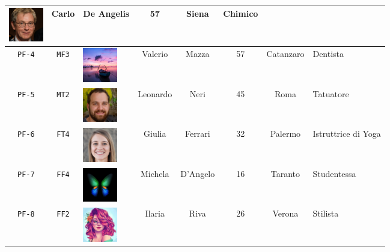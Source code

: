 \begin{table}[H]
\begin{tabular}[c]{ |c|c|m{1.5cm}|c|c|c|c|m{1.85cm}| }
	\vspace{.15cm}
	\includegraphics[height=1.5cm]{immagini/MT3.jpg}
	&Carlo&De Angelis&57&Siena&Chimico\\	 	
	\hline
	\cellcolor[HTML]{b0d7ff}\texttt{PF-4}&\cellcolor[HTML]{e6f2ff}\texttt{MF3}&	
	\vspace{.15cm}
	\includegraphics[height=1.5cm]{immagini/MF3.jpg}
	&Valerio&Mazza&57&Catanzaro&Dentista\\
	\hline 		
	\cellcolor[HTML]{b0d7ff}\texttt{PF-5}&\cellcolor[HTML]{e6f2ff}\texttt{MT2}&	
	\vspace{.15cm}
	\includegraphics[height=1.5cm]{immagini/MT2.jpg}
	&Leonardo&Neri&45&Roma&Tatuatore\\
	\hline
	\cellcolor[HTML]{b0d7ff}\texttt{PF-6}&\cellcolor[HTML]{e6f2ff}\texttt{FT4}&	
	\vspace{.15cm}
	\includegraphics[height=1.5cm]{immagini/FT4.jpg}
	&Giulia&Ferrari&32&Palermo&Istruttrice di Yoga\\ 
	\hline
	\cellcolor[HTML]{b0d7ff}\texttt{PF-7}&\cellcolor[HTML]{e6f2ff}\texttt{FF4}&	
	\vspace{.15cm}
	\includegraphics[height=1.5cm]{immagini/FF4.png}
	&Michela&D'Angelo&16&Taranto&Studentessa\\
	\hline
	\cellcolor[HTML]{b0d7ff}\texttt{PF-8}&\cellcolor[HTML]{e6f2ff}\texttt{FF2}&	
	\vspace{.15cm}
	\includegraphics[height=1.5cm]{immagini/FF2.png}
	&Ilaria&Riva&26&Verona&Stilista\\	
	

\end{tabular}
\end{table}
